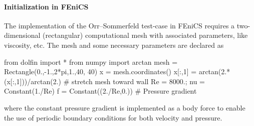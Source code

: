 \paragraph{Initialization in FEniCS}

The implementation of the Orr--Sommerfeld test-case in FEniCS requires
a two-dimensional (rectangular) computational mesh with associated
parameters, like viscosity, etc. The mesh and some necessary
parameters are declared as
\begin{python}
from dolfin import *
from numpy import arctan
mesh = Rectangle(0.,-1.,2*pi,1.,40, 40)
x = mesh.coordinates()
x[:,1] = arctan(2.*(x[:,1]))/arctan(2.)  # stretch mesh toward wall
Re = 8000.; nu = Constant(1./Re)
f = Constant((2./Re,0.)) # Pressure gradient
\end{python}
where the constant pressure gradient is implemented as a body force
to enable the use of periodic boundary conditions for both velocity
and pressure.

